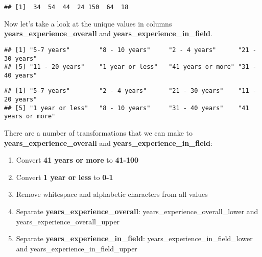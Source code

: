\documentclass[
]{article}
\newenvironment{Shaded}{\begin{snugshade}}{\end{snugshade}}
\newcommand{\FunctionTok}[1]{\textcolor[rgb]{0.00,0.00,0.00}{#1}}
\newcommand{\NormalTok}[1]{#1}
\newcommand{\SpecialCharTok}[1]{\textcolor[rgb]{0.00,0.00,0.00}{#1}}
\providecommand{\tightlist}{%
  \setlength{\itemsep}{0pt}\setlength{\parskip}{0pt}}
\begin{document}
\begin{verbatim}
## [1]  34  54  44  24 150  64  18
\end{verbatim}

Now let's take a look at the unique values in columns
\textbf{years\_experience\_overall} and
\textbf{years\_experience\_in\_field}.

\begin{Shaded}
\end{Shaded}

\begin{verbatim}
## [1] "5-7 years"        "8 - 10 years"     "2 - 4 years"      "21 - 30 years"   
## [5] "11 - 20 years"    "1 year or less"   "41 years or more" "31 - 40 years"
\end{verbatim}

\begin{Shaded}
\end{Shaded}

\begin{verbatim}
## [1] "5-7 years"        "2 - 4 years"      "21 - 30 years"    "11 - 20 years"   
## [5] "1 year or less"   "8 - 10 years"     "31 - 40 years"    "41 years or more"
\end{verbatim}

There are a number of transformations that we can make to
\textbf{years\_experience\_overall} and
\textbf{years\_experience\_in\_field}:

\begin{enumerate}
\def\labelenumi{\arabic{enumi}.}
\tightlist
\item
  Convert \textbf{41 years or more} to \textbf{41-100}
\item
  Convert \textbf{1 year or less} to \textbf{0-1}
\item
  Remove whitespace and alphabetic characters from all values
\item
  Separate \textbf{years\_experience\_overall}:
  years\_experience\_overall\_lower and
  years\_experience\_overall\_upper
\item
  Separate \textbf{years\_experience\_in\_field}:
  years\_experience\_in\_field\_lower and
  years\_experience\_in\_field\_upper
\end{enumerate}
\end{document}
